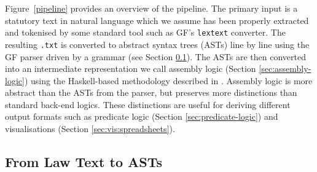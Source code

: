 \documentclass{IOS-Book-Article}
\begin{document}
Figure~\ref{pipeline} provides an overview of the pipeline. The primary input is a statutory text in natural language which we assume has been properly extracted and tokenised by some standard tool such as GF's \texttt{lextext} converter.
The resulting \texttt{.txt} is converted to abstract syntax trees (ASTs) line by line using the GF parser driven by a grammar (see Section \ref{sec:2.2}). 
The ASTs are then converted into an intermediate representation we call assembly logic (Section \ref{sec:assembly-logic}) using the Haskell-based methodology described in \cite{ranta-2011c}. Assembly logic is more abstract than the ASTs from the parser, but preserves more distinctions than standard back-end logics.
These distinctions are useful for deriving different output formats such as predicate logic (Section \ref{sec:predicate-logic}) and visualisations (Section \ref{sec:vis:spreadsheets}).




\subsection{From Law Text to ASTs}
\label{sec:2.2}
\end{document}
